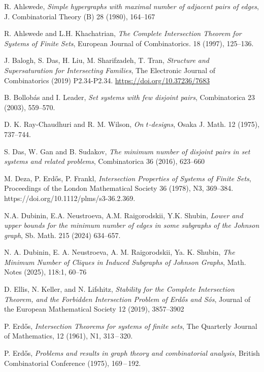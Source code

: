 \documentclass[12pt,a4paper]{article}
\begin{document}
\begin{thebibliography}{}
 R. Ahlswede, {\it Simple hypergraphs with maximal number of adjacent pairs of edges},
J. Combinatorial Theory (B) 28 (1980), 164--167

 R. Ahlswede and L.H. Khachatrian, {\it The Complete Intersection Theorem for Systems of Finite Sets}, European Journal of Combinatorics. 18 (1997), 125--136.

 J. Balogh, S. Das, H. Liu, M. Sharifzadeh, T. Tran, {\it Structure and Supersaturation for Intersecting Families}, The Electronic Journal of Combinatorics (2019) P2.34-P2.34. \url{https://doi.org/10.37236/7683}

 B. Bollob\'as and I. Leader, {\it Set systems with few disjoint pairs}, Combinatorica 23 (2003), 559–570.

 D. K. Ray-Chaudhuri and R. M. Wilson, {\it On $t$-designs}, Osaka J. Math. 12 (1975), 737--744.

 S. Das, W. Gan and B. Sudakov, {\it The minimum number of disjoint pairs in set systems and related
problems}, Combinatorica 36 (2016), 623--660

 M. Deza, P. Erd\H os, P. Frankl, {\it Intersection Properties of Systems of Finite Sets}, Proceedings of the London Mathematical Society 36 (1978), N3, 369--384. https://doi.org/10.1112/plms/s3-36.2.369.

 N.A. Dubinin, E.A. Neustroeva, A.M. Raigorodskii, Y.K. Shubin, {\it Lower and upper bounds for the minimum number of edges in some subgraphs of the Johnson graph}, Sb. Math. 215 (2024) 634--657.

 N. A. Dubinin, E. A. Neustroeva, A. M. Raigorodskii, Ya. K. Shubin, {\it The Minimum Number of Cliques in Induced Subgraphs of Johnson Graphs}, Math. Notes (2025), 118:1, 60--76

 D. Ellis, N. Keller, and N. Lifshitz, {\it Stability for the Complete Intersection Theorem, and the Forbidden Intersection Problem of Erd\H{o}s and S\'os}, Journal of the European Mathematical Society 12 (2019), 3857--3902

 P. Erd\H{o}s,
    \textit{Intersection Theorems for systems of finite sets},
    The Quarterly Journal of Mathematics, 12 (1961), N1, 313\,--\,320.

 P. Erd\H{o}s,
    \textit{Problems and results in graph theory and combinatorial analysis},
    British Combinatorial Conference (1975), 169\,--\,192.


\end{thebibliography}
\end{document}
